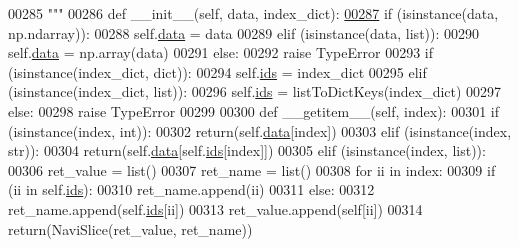 \begin{DoxyCode}
00285 \textcolor{stringliteral}{    """}
00286     \textcolor{keyword}{def }\_\_init\_\_(self, data, index\_dict):
\hypertarget{navidata_8py_source_l00287}{}\hyperlink{classnavicom_1_1navidata_1_1NaviSlice}{00287}         \textcolor{keywordflow}{if} (isinstance(data, np.ndarray)):
00288             self.\hyperlink{classnavicom_1_1navidata_1_1NaviSlice_a21ac86b9fbcb4ffc952782983690af5f}{data} = data
00289         \textcolor{keywordflow}{elif} (isinstance(data, list)):
00290             self.\hyperlink{classnavicom_1_1navidata_1_1NaviSlice_a21ac86b9fbcb4ffc952782983690af5f}{data} = np.array(data)
00291         \textcolor{keywordflow}{else}:
00292             \textcolor{keywordflow}{raise} TypeError
00293         \textcolor{keywordflow}{if} (isinstance(index\_dict, dict)):
00294             self.\hyperlink{classnavicom_1_1navidata_1_1NaviSlice_abc8769a0168ce54ee35624363deb0bcd}{ids} = index\_dict
00295         \textcolor{keywordflow}{elif} (isinstance(index\_dict, list)):
00296             self.\hyperlink{classnavicom_1_1navidata_1_1NaviSlice_abc8769a0168ce54ee35624363deb0bcd}{ids} = listToDictKeys(index\_dict)
00297         \textcolor{keywordflow}{else}:
00298             \textcolor{keywordflow}{raise} TypeError
00299 
00300     \textcolor{keyword}{def }\_\_getitem\_\_(self, index):
00301         \textcolor{keywordflow}{if} (isinstance(index, int)):
00302             \textcolor{keywordflow}{return}(self.\hyperlink{classnavicom_1_1navidata_1_1NaviSlice_a21ac86b9fbcb4ffc952782983690af5f}{data}[index])
00303         \textcolor{keywordflow}{elif} (isinstance(index, str)):
00304             \textcolor{keywordflow}{return}(self.\hyperlink{classnavicom_1_1navidata_1_1NaviSlice_a21ac86b9fbcb4ffc952782983690af5f}{data}[self.\hyperlink{classnavicom_1_1navidata_1_1NaviSlice_abc8769a0168ce54ee35624363deb0bcd}{ids}[index]])
00305         \textcolor{keywordflow}{elif} (isinstance(index, list)):
00306             ret\_value = list()
00307             ret\_name = list()
00308             \textcolor{keywordflow}{for} ii \textcolor{keywordflow}{in} index:
00309                 \textcolor{keywordflow}{if} (ii \textcolor{keywordflow}{in} self.\hyperlink{classnavicom_1_1navidata_1_1NaviSlice_abc8769a0168ce54ee35624363deb0bcd}{ids}):
00310                     ret\_name.append(ii)
00311                 \textcolor{keywordflow}{else}:
00312                     ret\_name.append(self.\hyperlink{classnavicom_1_1navidata_1_1NaviSlice_abc8769a0168ce54ee35624363deb0bcd}{ids}[ii])
00313                 ret\_value.append(self[ii])
00314             \textcolor{keywordflow}{return}(NaviSlice(ret\_value, ret\_name))

\end{DoxyCode}
